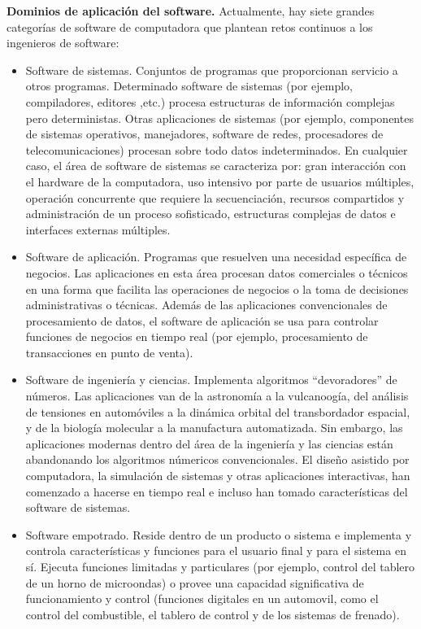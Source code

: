 \documentclass{article}
\begin{document}
\textbf{Dominios de aplicación del software.} Actualmente, hay siete grandes categorías de software de computadora que plantean retos continuos a los ingenieros de software:

\begin{itemize}
\item Software de sistemas. Conjuntos de programas que proporcionan servicio a otros programas. Determinado software de sistemas (por ejemplo, compiladores, editores ,etc.) procesa estructuras de información complejas pero deterministas. Otras aplicaciones de sistemas (por ejemplo, componentes de sistemas operativos, manejadores, software de redes, procesadores de telecomunicaciones) procesan sobre todo datos indeterminados. En cualquier caso, el área de software de sistemas se caracteriza por: gran interacción con el hardware de la computadora, uso intensivo por parte de usuarios múltiples, operación concurrente que requiere la secuenciación, recursos compartidos y administración de un proceso sofisticado, estructuras complejas de datos e interfaces externas múltiples.

\item Software de aplicación. Programas que resuelven una necesidad específica de negocios. Las aplicaciones en esta área procesan datos comerciales o técnicos en una forma que facilita las operaciones de negocios o la toma de decisiones administrativas o técnicas. Además de las aplicaciones convencionales de procesamiento de datos, el software de aplicación se usa para controlar funciones de negocios en tiempo real (por ejemplo, procesamiento de transacciones en punto de venta).

\item Software de ingeniería y ciencias. Implementa algoritmos ``devoradores'' de números. Las aplicaciones van de la astronomía a la vulcanoogía, del análisis de tensiones en automóviles a la dinámica orbital del transbordador espacial, y de la biología molecular a la manufactura automatizada. Sin embargo, las aplicaciones modernas dentro del área de la ingeniería y las ciencias están abandonando los algoritmos númericos convencionales. El diseño asistido por computadora, la simulación de sistemas y otras aplicaciones interactivas, han comenzado a hacerse en tiempo real e incluso han tomado características del software de sistemas. 

\item Software empotrado. Reside dentro de un producto o sistema e implementa y controla características y funciones para el usuario final y para el sistema en sí. Ejecuta funciones limitadas y particulares (por ejemplo, control del tablero de un horno de microondas) o provee una capacidad significativa de funcionamiento y control (funciones digitales en un automovil, como el control del combustible, el tablero de control y de los sistemas de frenado).


\end{itemize}
\end{document}
